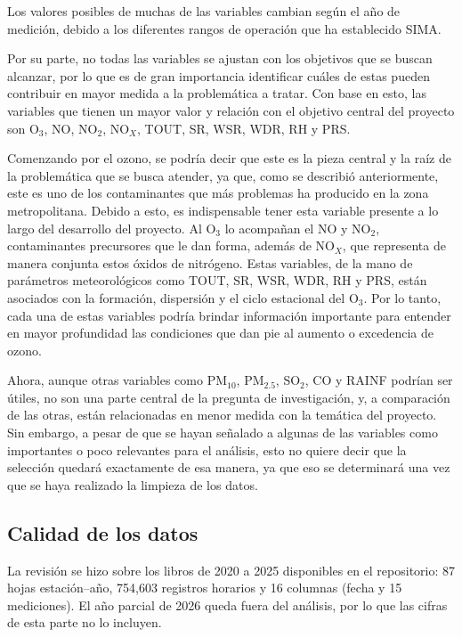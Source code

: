 \documentclass[11pt,letterpaper]{article}
\begin{document}
Los valores posibles de muchas de las variables cambian seg\'un el a\~no de medici\'on, debido a los diferentes rangos de operaci\'on que ha establecido SIMA.

Por su parte, no todas las variables se ajustan con los objetivos que se buscan alcanzar, por lo que es de gran importancia identificar cu\'ales de estas pueden contribuir en mayor medida a la problem\'atica a tratar. Con base en esto, las variables que tienen un mayor valor y relaci\'on con el objetivo central del proyecto son O$_3$, NO, NO$_2$, NO$_X$, TOUT, SR, WSR, WDR, RH y PRS.

Comenzando por el ozono, se podr\'ia decir que este es la pieza central y la ra\'iz de la problem\'atica que se busca atender, ya que, como se describi\'o anteriormente, este es uno de los contaminantes que m\'as problemas ha producido en la zona metropolitana. Debido a esto, es indispensable tener esta variable presente a lo largo del desarrollo del proyecto. Al O$_3$ lo acompa\~nan el NO y NO$_2$, contaminantes precursores que le dan forma, adem\'as de NO$_X$, que representa de manera conjunta estos \'oxidos de nitr\'ogeno. Estas variables, de la mano de par\'ametros meteorol\'ogicos como TOUT, SR, WSR, WDR, RH y PRS, est\'an asociados con la formaci\'on, dispersi\'on y el ciclo estacional del O$_3$. Por lo tanto, cada una de estas variables podr\'ia brindar informaci\'on importante para entender en mayor profundidad las condiciones que dan pie al aumento o excedencia de ozono.

Ahora, aunque otras variables como PM$_{10}$, PM$_{2.5}$, SO$_2$, CO y RAINF podr\'ian ser \'utiles, no son una parte central de la pregunta de investigaci\'on, y, a comparaci\'on de las otras, est\'an relacionadas en menor medida con la tem\'atica del proyecto. Sin embargo, a pesar de que se hayan se\~nalado a algunas de las variables como importantes o poco relevantes para el an\'alisis, esto no quiere decir que la selecci\'on quedar\'a exactamente de esa manera, ya que eso se determinar\'a una vez que se haya realizado la limpieza de los datos.

\subsection{Calidad de los datos}
La revisi\'on se hizo sobre los libros de 2020 a 2025 disponibles en el repositorio: 87 hojas estaci\'on--a\~no, 754,603 registros horarios y 16 columnas (fecha y 15 mediciones). El a\~no parcial de 2026 queda fuera del an\'alisis, por lo que las cifras de esta parte no lo incluyen.
\end{document}
